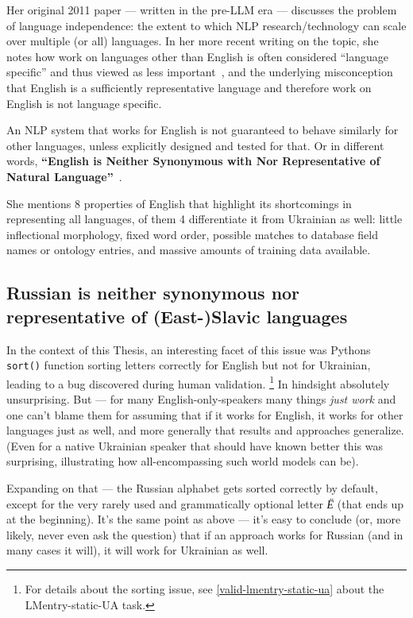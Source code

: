 Her original 2011 paper --- written in the pre-LLM era --- discusses the
problem of language independence: the extent to which NLP
research/technology can scale over multiple (or
\textquotesingle all\textquotesingle) languages. In her more recent
writing on the topic, she notes how work on languages other than English
is often considered ``language specific'' and thus viewed as less
important~\cite{benderpost}, and the underlying misconception that
English is a sufficiently representative language and therefore work on
English is not language specific.

An NLP system that works for English is not guaranteed to behave
similarly for other languages, unless explicitly designed and tested for
that. Or in different words, \textbf{``English is Neither Synonymous with
Nor Representative of Natural Language''}~\cite{benderpost}.

She mentions 8 properties of English that highlight
its shortcomings in representing all languages, of them
4 differentiate it from Ukrainian as well: little inflectional morphology, fixed word order,
possible matches to database field names or ontology entries, and
massive amounts of training data available.

\subsection{Russian is neither synonymous nor representative of (East-)Slavic languages}
\label{sec:russian-not-representative}

In the context of this Thesis, an interesting facet of this issue was 
Python\textquotesingle s \texttt{sort()} function sorting letters correctly for English but not for Ukrainian, leading to a bug discovered during human validation.%
\footnote{For
details about the sorting issue, see \autoref{valid-lmentry-static-ua} about the
LMentry-static-UA task.} In
hindsight absolutely unsurprising. 
But — for many English-only-speakers many things \emph{just work} and one can't
blame them for assuming that if it works for English, it works for other languages just as well, and more generally that results and approaches
generalize. 
(Even for a native Ukrainian speaker that should have known better this was surprising, illustrating how all-encompassing such world models can be). 

Expanding on that — the Russian alphabet gets sorted correctly by default, except for the very rarely used 
 and grammatically optional letter \textit{Ё} (that ends up at the beginning). 
 It's the same point as above — it's easy to conclude (or, more likely, never even ask the question) that if an approach works for Russian (and in many cases it will), it will work for Ukrainian as well. 
 
